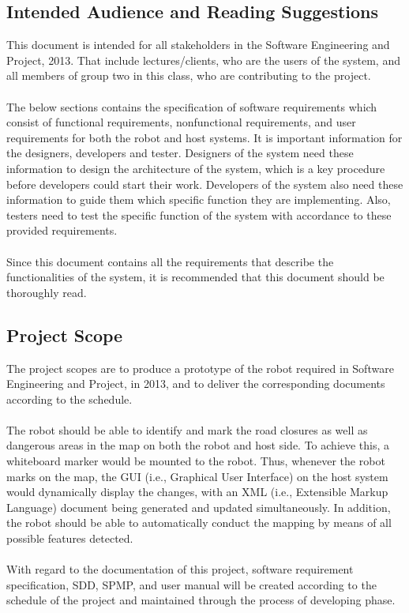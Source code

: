 \documentclass[titlepage]{article}
\begin{document}
\subsection{Intended Audience and Reading Suggestions}
This document is intended for all stakeholders in the Software Engineering and Project, 2013. That include lectures/clients, who are the users of the system, and all members of group two in this class, who are contributing to the project.\\
\\
The below sections contains the specification of software requirements which consist of functional requirements, nonfunctional requirements, and user requirements for both the robot and host systems. It is important information for the designers, developers and tester. Designers of the system need these information to design the architecture of the system, which is a key procedure before developers could start their work. Developers of the system also need these information to guide them which specific function they are implementing. Also, testers need to test the specific function of the system with accordance to these provided requirements.\\
\\
Since this document contains all the requirements that describe the functionalities of the system, it is recommended that this document should be thoroughly read.
\subsection{Project Scope}
The project scopes are to produce a prototype of the robot required in Software Engineering and Project, in 2013, and to deliver the corresponding documents according to the schedule.\\
\\
The robot should be able to identify and mark the road closures as well as dangerous areas in the map on both the robot and host side. To achieve this, a whiteboard marker would be mounted to the robot. Thus, whenever the robot marks on the map, the GUI (i.e., Graphical User Interface) on the host system would dynamically display the changes, with an XML (i.e., Extensible Markup Language) document being generated and updated simultaneously. In addition, the robot should be able to automatically conduct the mapping by means of all possible features detected.\\
\\
With regard to the documentation of this project, software requirement specification, SDD, SPMP, and user manual will be created according to the schedule of the project and maintained through the process of developing phase.\\
\end{document}
